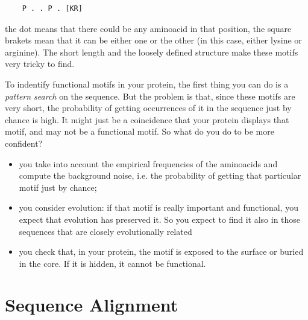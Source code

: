 \begin{verbatim}
    P . . P . [KR]
\end{verbatim}
the dot means that there could be any aminoacid in that position, the square brakets mean that it can be either one or the other (in this case, either lysine or arginine).
The short length and the loosely defined structure make these motifs very tricky to find. 

To indentify functional motifs in your protein, the first thing you can do is a \textit{pattern search} on the sequence. But the problem is that, since these motifs are very short,
the probability of getting occurrences of it in the sequence just by chance is high. It might just be a coincidence that your protein displays that motif, and may not be a functional motif.
So what do you do to be more confident?
\begin{itemize}
    \item you take into account the empirical frequencies of the aminoacids and compute the background noise, i.e. the probability of getting that particular motif just by chance;
    \item you consider evolution: if that motif is really important and functional, you expect that evolution has preserved it. So you expect to find it also in those sequences that are closely evolutionally related 
    \item you check that, in your protein, the motif is exposed to the surface or buried in the core. If it is hidden, it cannot be functional.
\end{itemize}

\section{Sequence Alignment}

